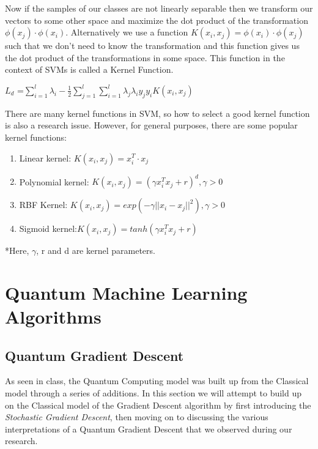 \documentclass{article}
\begin{document}
	Now if the samples of our classes are not linearly separable then we transform our vectors to some other space and maximize the dot product of the transformation $\phi(x_j)\cdot\phi(x_i)$. Alternatively we use a function $K(x_i,x_j)=\phi(x_i)\cdot\phi(x_j)$ such that we don't need to know the transformation and this function gives us the dot product of the transformations in some space. This function in the context of SVMs is called a Kernel Function.
	\begin{center}
	    $L_d$ =$ \sum_{i=1}^l \lambda_i-\frac{1}{2}\sum_{j=1}^l\sum_{i=1}^l\lambda_j\lambda_i y_j y_i K(x_i, x_j)$
	\end{center}
	There are many kernel functions in SVM, so how to select a good kernel function is also a research issue. However, for general purposes, there are some popular kernel functions:\
    \begin{enumerate}
        \item Linear kernel: $K (x_i , x_j) = x_i^T\cdot x_j$ 
        \item Polynomial kernel: $K (x_i , x_j) = (\gamma x_i^T x_j + r)^d , \gamma > 0$ 
        \item RBF Kernel: $ K (x_i , x_j) = exp(-\gamma ||x_i - x_j||^2) , \gamma > 0$
        \item Sigmoid kernel:$ K (x_i , x_j) = tanh(\gamma x_i^T x_j + r)$ 
    \end{enumerate}
\begin{flushright}
    *Here, $\gamma$, r and d are kernel parameters.\cite{BOOK:3}

\end{flushright}
	
\section{Quantum Machine Learning Algorithms}
\subsection{Quantum Gradient Descent}
\par
As seen in class, the Quantum Computing model was built up from the Classical model through a series of additions. In this section we will attempt to build up on the Classical model  of the Gradient Descent algorithm by first introducing the \textit{Stochastic Gradient Descent}, then moving on to discussing the various interpretations of a Quantum Gradient Descent that we observed during our research. 
\end{document}
